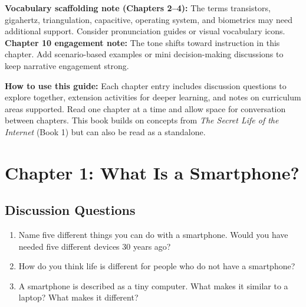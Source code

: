 

\begin{tcolorbox}[enhanced,colback=SunYellow!12,colframe=TechPurple!55,arc=6pt,boxrule=1pt,left=10pt,right=10pt,top=8pt,bottom=8pt]
\textbf{Vocabulary scaffolding note (Chapters 2--4):} The terms transistors, gigahertz, triangulation, capacitive, operating system, and biometrics may need additional support. Consider pronunciation guides or visual vocabulary icons.\\
\textbf{Chapter 10 engagement note:} The tone shifts toward instruction in this chapter. Add scenario-based examples or mini decision-making discussions to keep narrative engagement strong.
\end{tcolorbox}

\begin{tcolorbox}[enhanced,colback=LightGray,colframe=TechPurple!50,arc=6pt,boxrule=1pt,
  left=10pt,right=10pt,top=10pt,bottom=10pt]
\textbf{How to use this guide:}
Each chapter entry includes discussion questions to explore together,
extension activities for deeper learning, and notes on curriculum areas supported.
Read one chapter at a time and allow space for conversation between chapters.
This book builds on concepts from \emph{The Secret Life of the Internet} (Book 1)
but can also be read as a standalone.
\end{tcolorbox}

\vspace{12pt}

\section*{Chapter 1: What Is a Smartphone?}

\subsection*{Discussion Questions}
\begin{enumerate}
  \item Name five different things you can do with a smartphone. Would you have needed five different devices 30 years ago?
  \item How do you think life is different for people who do not have a smartphone?
  \item A smartphone is described as a tiny computer. What makes it similar to a laptop? What makes it different?
\end{enumerate}

